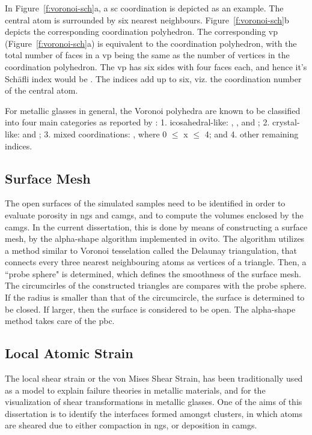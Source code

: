 In Figure~\ref{f:voronoi-sch}a, a \gls{sc} coordination is depicted as an example. The central atom is surrounded by six nearest neighbours. Figure~\ref{f:voronoi-sch}b depicts the corresponding coordination polyhedron. The corresponding \gls{vp} (Figure~\ref{f:voronoi-sch}a) is equivalent to the coordination polyhedron, with the total number of faces in a \gls{vp} being the same as the number of vertices in the coordination polyhedron. The \gls{vp} has six sides with four faces each, and hence it's Sch\"afli index would be . The indices add up to six, viz. the coordination number of the central atom. \par

For metallic glasses in general, the Voronoi polyhedra are known to be classified into four main categories as reported by \textcite{Yue2018}: 1. icosahedral-like: , , and ; 2. crystal-like:  and ; 3. mixed coordinations: , where 0 $\leq$ x $\leq$ 4; and 4. other remaining indices. \par


\subsection{Surface Mesh} \label{s:surmesh}
The open surfaces of the simulated samples need to be identified in order to evaluate porosity in \gls{ng}s and \gls{camg}s, and to compute the volumes enclosed by the \gls{camg}s. In the current dissertation, this is done by means of constructing a surface mesh, by the alpha-shape algorithm \cite{Stukowski2014} implemented in \gls{ovito}. The algorithm utilizes a method similar to Voronoi tesselation called the Delaunay triangulation, that connects every three nearest neighbouring atoms as vertices of a triangle. Then, a ``probe sphere" is determined, which defines the smoothness of the surface mesh. The circumcirles of the constructed triangles are compares with the probe sphere. If the radius is smaller than that of the circumcircle, the surface is determined to be closed. If larger, then the surface is considered to be open. The alpha-shape method takes care of the \gls{pbc}.

\subsection{Local Atomic Strain} \label{s:vonMises}
The local shear strain or the von Mises Shear Strain, has been traditionally used as a model to explain failure theories in metallic materials, and for the visualization of shear transformations in metallic glasses. One of the aims of this dissertation is to identify the interfaces formed amongst clusters, in which atoms are sheared due to either compaction in \gls{ng}s, or deposition in \gls{camg}s.  \par

